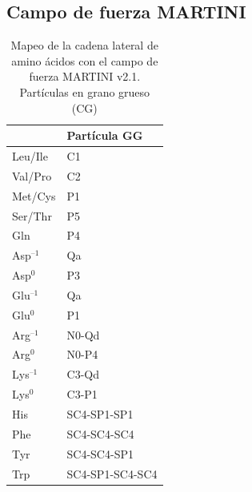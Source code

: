 \begin{appendix}
\subsection{Campo de fuerza MARTINI}



\begin{table}[]
\centering
\caption{Mapeo de la cadena lateral de amino ácidos con el campo de fuerza MARTINI v2.1. Partículas en grano grueso (CG)}
\label{tab:cg_particles}
\begin{tabular}{@{}ll@{}}
\toprule
\rowcolor[HTML]{EFEFEF} 
\multicolumn{1}{l}{\cellcolor[HTML]{EFEFEF}Cadena lateral} & \multicolumn{1}{l}{\cellcolor[HTML]{EFEFEF}Partícula GG} \\ \midrule
Leu/Ile  & C1              \\
Val/Pro  & C2              \\
Met/Cys  & P1              \\
Ser/Thr  & P5              \\
Gln      & P4              \\
Asp$^\text{--1}$ & Qa              \\
Asp$^0$  & P3              \\
Glu$^\text{--1}$ & Qa              \\
Glu$^0$  & P1              \\
Arg$^\text{--1}$ & N0-Qd           \\
Arg$^0$  & N0-P4            \\
Lys$^\text{--1}$ & C3-Qd           \\
Lys$^0$  & C3-P1           \\
His      & SC4-SP1-SP1     \\
Phe      & SC4-SC4-SC4     \\
Tyr      & SC4-SC4-SP1     \\
Trp      & SC4-SP1-SC4-SC4 \\ \bottomrule
\end{tabular}
\end{table}




\end{appendix}
